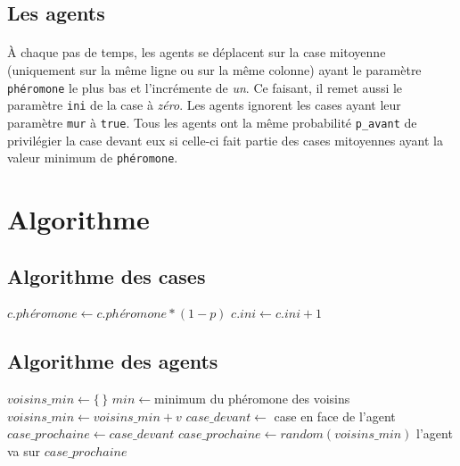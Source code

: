\documentclass{article}
\begin{document}
    \subsection{Les agents}

        \paragraph{}À chaque pas de temps, les agents se déplacent sur la case mitoyenne (uniquement sur la même ligne ou sur la même colonne) 
        ayant le paramètre \texttt{phéromone} le plus bas et l'incrémente de \textit{un}. Ce faisant, il remet aussi le paramètre \texttt{ini} 
        de la case à \textit{zéro}. Les agents ignorent les cases ayant leur paramètre \texttt{mur} à \texttt{true}. Tous les agents ont la 
        même probabilité \texttt{p\_avant} de privilégier la case devant eux si celle-ci fait partie des cases mitoyennes ayant la valeur minimum
        de \texttt{phéromone}.
\section{Algorithme}
    \subsection{Algorithme des cases}
    \begin{algorithmic}
            \STATE $c.ph$\textit{é}$romone \gets c.ph$\textit{é}$romone  * (1-p)$
            \STATE $c.ini \gets c.ini+1$
        \ENDIF 
        \ENDFOR
        \end{algorithmic}
    \subsection{Algorithme des agents}
    \begin{algorithmic}
            \STATE $voisins\_min \gets \{\,\}$
            \STATE $min \gets $minimum du phéromone des voisins
                    \STATE $voisins\_min \gets voisins\_min + v$
                \ENDIF
            \ENDFOR
            \STATE $case\_devant \gets$ case en face de l'agent
                \STATE  $case\_prochaine \gets case\_devant$
            \ELSE
                \STATE $case\_prochaine \gets random(voisins\_min)$
            \ENDIF
            \STATE l'agent va sur $case\_prochaine$
        \ENDFOR
    \end{algorithmic}
\end{document}
